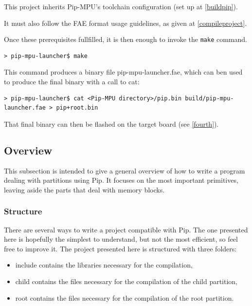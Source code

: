 \documentclass[10pt,a4paper,titlepage]{refart}
\begin{document}

This project inherits Pip-MPU's toolchain configuration (set up at \ref{buildpip}).

It must also follow the FAE format usage guidelines, as given at \ref{compileproject}.

Once these prerequisites fullfilled, it is then enough to invoke the \texttt{make} command.
\begin{lstlisting}[style=BashStyle]
> pip-mpu-launcher$ make
\end{lstlisting}

This command produces a binary file pip-mpu-launcher{.}fae, which can ben used to produce the final binary with a call to cat:

\begin{lstlisting}[style=BashStyle]
> pip-mpu-launcher$ cat <Pip-MPU directory>/pip.bin build/pip-mpu-launcher.fae > pip+root.bin
\end{lstlisting}

That final binary can then be flashed on the target board (see \cref{fourth}).

\subsection{Overview}\label{subsec:overview}

This subsection is intended to give a general overview of how to write a program dealing with partitions using Pip. It focuses on 
the most important primitives, leaving aside the parts that deal with memory blocks.

\subsubsection{Structure}

There are several ways to write a project compatible with Pip. The one presented here is hopefully the simplest to understand, but 
not the most efficient, so feel free to improve it. The project presented here is structured with three folders:
\begin{itemize}
    \item include contains the libraries necessary for the compilation,
    \item child contains the files necessary for the compilation of the child partition,
    \item root contains the files necessary for the compilation of the root partition.
\end{itemize}
\end{document}
